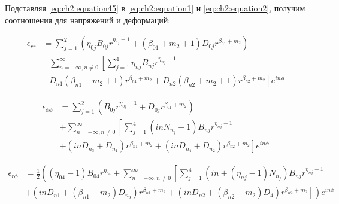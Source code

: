 Подставляя \cref{eq:ch2:equation45} в  \cref{eq:ch2:equation1} и  \cref{eq:ch2:equation2}, получим соотношения для напряжений и деформаций:

\begin{equation}
	\label{eq:ch2:equation46}
	\begin{split}
	\epsilon_{rr} &= \sum_{j=1}^2 \left (\eta_{0j} B_{0j} r^{\eta_{0j}-1} + \left ( \beta_{01}+m_2+1 \right ) D_{0j} r^{\beta_{01}+m_2} \right ) 
	\\
	&+ \sum_{n=-\infty, n \ne 0}^{\infty}  \left [ \sum_{j=1}^4 \eta_{nj} B_{nj} r^{\eta_{nj}-1} \right.\\
	& \left. +  D_{n1} \left (\beta_{n1}+m_2+1 \right ) r^{\beta_{n1}+m_2} +   D_{n2} \left ( \beta_{n2}+m_2+1 \right ) r^{\beta_{n2}+m_2} \right ] e^{in\phi}
	\end{split}
\end{equation}


\begin{equation}
	\label{eq:ch2:equation47}
	\begin{split}
	\epsilon_{\phi \phi} &= \sum_{j=1}^2 \left (B_{0j} r^{\eta_{0j}-1} + D_{0j} r^{\beta_{01}+m_2} \right ) 
	\\
	&+ \sum_{n=-\infty, n \ne 0}^{\infty}  \left [ \sum_{j=1}^4 \left (in N_{n_j} + 1\right ) B_{nj} r^{\eta_{nj}-1} \right.\\
	& \left. + \left (in D_{n_3} + D_{n_1}\right )  r^{\beta_{n1}+m_2} +   \left (in D_{n_4} + D_{n_2}\right )  r^{\beta_{n2}+m_2} \right ] e^{in\phi}
	\end{split}
\end{equation}

\begin{equation}
	\label{eq:ch2:equation48}
	\begin{split}
		\epsilon_{r\phi} & = \frac{1}{2}  \left (  \left (\eta_{04}-1 \right )B_{04} r^{\eta_{04}} + \sum_{n=-\infty, n \ne 0}^{\infty}  \left [ \sum_{j=1}^4 \left (in + \left ( \eta_{nj}-1 \right ) N_{n_j} \right ) B_{nj} r^{\eta_{nj}-1} \right. \right. \\
		&  \left. \left. + \left (in  D_{n1} + \left (\beta_{n1}+m_2 \right ) D_{n_3} \right ) r^{\beta_{n1}+m_2} +  \left ( in D_{n2} + \left ( \beta_{n2}+m_2 \right ) D_4 \right ) r^{\beta_{n2}+m_2} \right ] \right ) e^{in\phi}
	\end{split}
\end{equation}

